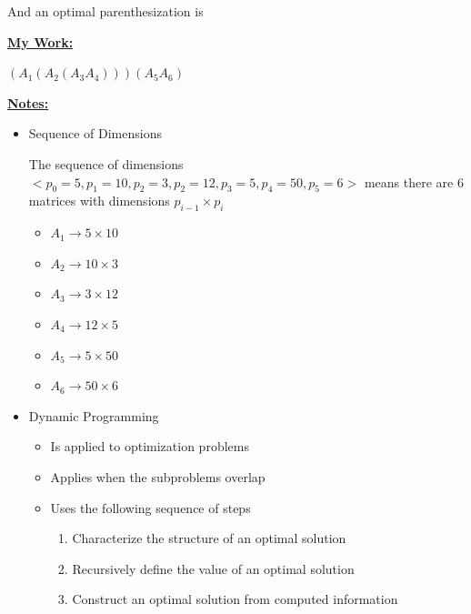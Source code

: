 \documentclass[12pt]{article}
\begin{document}
\begin{enumerate}[1.]
\begin{mdframed}
        And an optimal parenthesization is

        \begin{mdframed}
            \underline{\textbf{My Work:}}

            \bigskip

            \color{red} $(A_1(A_2(A_3A_4)))(A_5A_6)$ \color{black}
        \end{mdframed}


    \end{mdframed}

    \bigskip

    \underline{\textbf{Notes:}}

    \bigskip

    \begin{itemize}
        \item Sequence of Dimensions

        \bigskip

        The sequence of dimensions $<p_0 = 5,p_1 = 10,p_2 = 3,p_2 = 12,p_3 = 5,p_4 = 50,p_5 = 6>$ means there are 6 matrices
        with dimensions $p_{i-1} \times p_i$

        \bigskip

        \begin{itemize}
            \item $A_1 \to 5 \times 10$
            \item $A_2 \to 10 \times 3$
            \item $A_3 \to 3 \times 12$
            \item $A_4 \to 12 \times 5$
            \item $A_5 \to 5 \times 50$
            \item $A_6 \to 50 \times 6$
        \end{itemize}

        \item Dynamic Programming

        \begin{itemize}
            \item Is applied to optimization problems
            \item Applies when the subproblems overlap
            \item Uses the following sequence of steps

            \begin{enumerate}[1.]
                \item Characterize the structure of an optimal solution
                \item Recursively define the value of an optimal solution
                \item Construct an optimal solution from computed information
            \end{enumerate}
        \end{itemize}


\end{itemize}
\end{enumerate}
\end{document}
